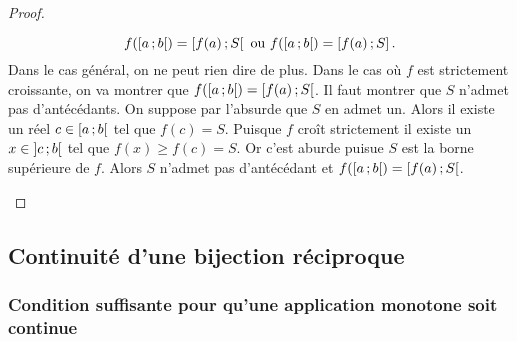 \begin{proof}
\begin{enumerate}
\begin{equation}
      f(\left[ a \, ;  b \right[) = \left[ f(a) \, ;  S \right[ \text{~ou~} f(\left[ a \, ;  b \right[) = \left[ f(a) \, ;  S \right].
    \end{equation}
    Dans le cas général, on ne peut rien dire de plus. Dans le cas où $f$ est strictement croissante, on va montrer que $f(\left[ a \, ;  b \right[) = \left[ f(a) \, ;  S \right[$. Il faut montrer que $S$ n'admet pas d'antécédants. On suppose par l'absurde que $S$ en admet un. Alors il existe un réel $c \in \left[ a \, ;  b \right[$ tel que $f(c)=S$. Puisque $f$ croît strictement il existe un $x \in \left] c \, ;  b \right[$ tel que $f(x) \geq f(c)=S$. Or c'est aburde puisue $S$ est la borne supérieure de $f$. Alors $S$ n'admet pas d'antécédant et $f(\left[ a \, ;  b \right[) = \left[ f(a) \, ;  S \right[$.
  \end{enumerate}
\end{proof}

\subsection{Continuité d'une bijection réciproque}

\subsubsection[Pour qu'une application monotone soit continue]{Condition suffisante pour qu'une application monotone soit continue}

